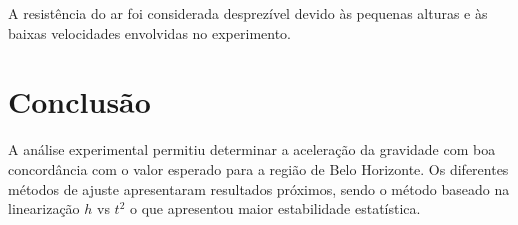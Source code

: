 \documentclass[12pt,a4paper]{article}
\begin{document}
A resistência do ar foi considerada desprezível devido às pequenas alturas e às baixas velocidades envolvidas no experimento.

\section{Conclusão}

A análise experimental permitiu determinar a aceleração da gravidade com boa concordância com o valor esperado para a região de Belo Horizonte. Os diferentes métodos de ajuste apresentaram resultados próximos, sendo o método baseado na linearização $h$ vs $t^2$ o que apresentou maior estabilidade estatística.
\end{document}
